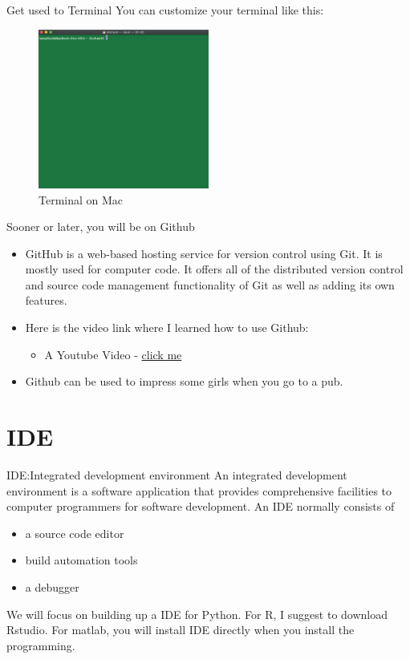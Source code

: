 \documentclass[handout]{beamer} %
\begin{document}
\begin{frame}{Get used to Terminal}
	You can customize your terminal like this:
	\begin{figure}[H]
		\centering
		\includegraphics[width = 0.5\textwidth]{Pictures/terminal2}
		\caption{Terminal on Mac}
	\end{figure}
\end{frame}

\begin{frame}{Sooner or later, you will be on Github}
\begin{itemize}
\setlength\itemsep{1em} 
	\item GitHub is a web-based hosting service for version control using Git. It is mostly used for computer code. It offers all of the distributed version control and source code management functionality of Git as well as adding its own features.
	\item Here is the video link where I learned how to use Github: \begin{itemize} 
	\item A Youtube Video - \href{https://www.youtube.com/watch?v=0fKg7e37bQE&fbclid=IwAR3qiy3lyLxkwiE_6recElswiRJsknhFnnhjK5M4OMNkzBbI2aco01fJBOo}{click me \Coffeecup }
	\end{itemize}
	\item Github can be used to impress some girls when you go to a pub. 
\end{itemize}
\end{frame}


\section{IDE}

\begin{frame}{IDE:Integrated development environment}
	An integrated development environment is a software application that provides comprehensive facilities to computer programmers for software development. An IDE normally consists of 
	\begin{itemize}
	\setlength\itemsep{1em}
		\item a source code editor
		\item build automation tools
		\item a debugger
	\end{itemize} 
We will focus on building up a IDE for Python. For R, I suggest to download Rstudio. For matlab, you will install IDE directly when you install the programming. 
\end{frame}
\end{document}

